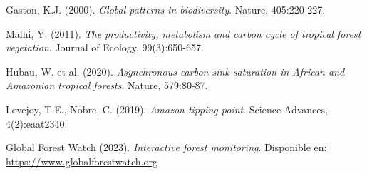 \documentclass[12pt,a4paper]{article}
\begin{document}
\begin{thebibliography}{99}
 Gaston, K.J. (2000). \textit{Global patterns in biodiversity}. Nature, 405:220-227.

 Malhi, Y. (2011). \textit{The productivity, metabolism and carbon cycle of tropical forest vegetation}. Journal of Ecology, 99(3):650-657.

 Hubau, W. et al. (2020). \textit{Asynchronous carbon sink saturation in African and Amazonian tropical forests}. Nature, 579:80-87.

 Lovejoy, T.E., Nobre, C. (2019). \textit{Amazon tipping point}. Science Advances, 4(2):eaat2340.

 Global Forest Watch (2023). \textit{Interactive forest monitoring}. Disponible en: \url{https://www.globalforestwatch.org}
\end{thebibliography}
\end{document}
